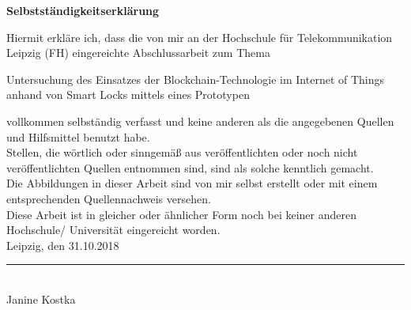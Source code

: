 \documentclass[toc=sectionentrywithdots,a4paper,12pt,oneside]{scrartcl}
\newcommand{\thema}{Untersuchung des Einsatzes der Blockchain-Technologie im Internet of Things anhand  von Smart Locks mittels eines Prototypen}
\newcommand{\name}{Janine Kostka}
\newcommand{\abgabe}{31.10.2018}
\begin{document}
	\newpage
	\thispagestyle{empty}
	\vspace*{3em}
	\begin{center}
		\LARGE \textbf{Selbstständigkeitserklärung}
	\end{center}
	\normalsize
	\vspace*{3em}
	Hiermit erkläre ich, dass die von mir an der Hochschule für Telekommunikation Leipzig (FH)
	eingereichte Abschlussarbeit zum Thema
	\vspace*{1em}
	\begin{center}
		\thema
	\end{center}
	\vspace*{1em}
	vollkommen selbständig verfasst und keine anderen als die angegebenen Quellen und
	Hilfsmittel benutzt habe.
	\\[2em]
	Stellen, die wörtlich oder sinngemäß aus veröffentlichten oder noch nicht veröffentlichten
	Quellen entnommen sind, sind als solche kenntlich gemacht.
	\\[2em]
	Die Abbildungen in dieser Arbeit sind von mir selbst erstellt oder mit einem entsprechenden
	Quellennachweis versehen.
	\\[2em]
	Diese Arbeit ist in gleicher oder ähnlicher Form noch bei keiner anderen Hochschule/
	Universität eingereicht worden.
	\\[6em]
	
	Leipzig, den \abgabe \tab \rule{6cm}{0.5pt}\\
	\hspace*{22em}\name
	\newpage
	
	\normalsize
	\tableofcontents
	\newpage
	\listoffigures
	\newpage
	\listoftables
	\newpage
	\printglossary[type=\acronymtype]
	\thispagestyle{empty}
	\newpage
	

    \listoftodos
    \newpage
    
    \newpage
    
    
    
    
    
    
    \newpage
    
    
    
    
    \newpage
    
    \newpage
    
    \newpage
    
    \newpage
    
    \newpage
    
    \nocite{*}

	
	
\newpage	
\printbibliography[title=Literaturverzeichnis]
\end{document}
